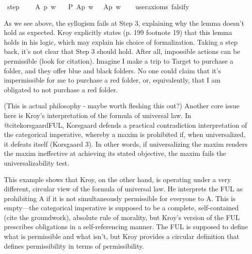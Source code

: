 \begin{isabellebody}
\isadelimproof
\isanewline
%
\endisadelimproof
\isanewline
{}\isamarkupfalse%
\ step{}{\isacharcolon}\ \isanewline
\ \ \ A\ p\ w\isanewline
\ \ \ {\isachardoublequoteopen}P\ {\isacharbraceleft}A{\isacharparenleft}p{\isacharparenright}{\isacharbraceright}\ w\ {\isasymlongrightarrow}\ {\isacharparenleft}{\isasymdiamond}\ {\isacharparenleft}A{\isacharparenleft}p{\isacharparenright}{\isacharparenright}\ w{\isacharparenright}{\isachardoublequoteclose}\isanewline
\ \ \isamarkupfalse%
\ {\isacharbrackleft}user{\isacharunderscore}axioms{\isacharcomma}\ falsify{\isacharbrackright}%
\isadelimproof
\ %
\endisadelimproof
%
\isatagproof
{}\isamarkupfalse%
\isanewline
%
%
\endisatagproof
{\isafoldproof}%
%
\isadelimproof
%
\endisadelimproof
%
\begin{isamarkuptext}%
As we see above, the syllogism fails at Step 3, explaining why the lemma doesn't 
        hold as expected. Kroy explicitly states (p. 199 footnote 19) that this lemma holds in his logic, which may explain
        his choice of formalization. Taking a step back, it's not clear that Step 3 should hold. After all,
        impossible actions can be permissible (look for citation). Imagine I make a trip to Target to 
        purchase a folder, and they offer blue and black folders. No one could claim that it's impermissible
        for me to purchase a red folder, or, equivalently, that I am obligated to not purchase a red folder.%
\end{isamarkuptext}\isamarkuptrue%
%
\begin{isamarkuptext}%
(This is actual philosophy - maybe worth fleshing this out?)
        Another core issue here is Kroy's interpretation of the formula of universal law. In @cite{korsgaardFUL}, 
        Korsgaard defends a practical contradiction interpretation of the categorical imperative, whereby 
        a maxim is prohibited if, when universalized, it defeats itself (Korsgaard 3). In other words, if universalizing
        the maxim renders the maxim ineffective at achieving its stated objective, the maxim fails the
        universalizability test. 

        This example shows that Kroy, on the other hand, is operating under a very different, circular view of 
        the formula of universal law. He interprets the FUL as prohibiting A if it is not simultaneously 
        permissible for everyone to A. This is empty—the categorical imperative is supposed to be a complete,
        self-contained (cite the groundwork), absolute rule of morality, but Kroy's version of the FUL prescribes obligations 
        in a self-referencing manner. The FUL is supposed to define what is permissible and what isn't, 
        but Kroy provides a circular definition that defines permissibility in terms of permissibility.
        

\end{isamarkuptext}
\end{isabellebody}
